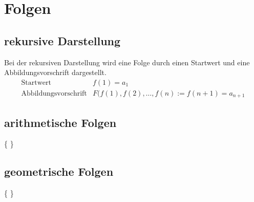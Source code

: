 \section{Folgen}

\subsection{rekursive Darstellung}
Bei der rekursiven Darstellung wird eine Folge durch einen Startwert und eine Abbildungsvorschrift dargestellt. 
\[ \boxed{ \begin{matrix}
\text{Startwert} & f(1) = a_1 \\
\text{Abbildungsvorschrift} & F(f(1), f(2), \ldots, f(n) := f(n + 1) = a_{n + 1}
\end{matrix}}\]
\subsection{arithmetische Folgen}
\{  \}
\subsection{geometrische Folgen}
\{  \}